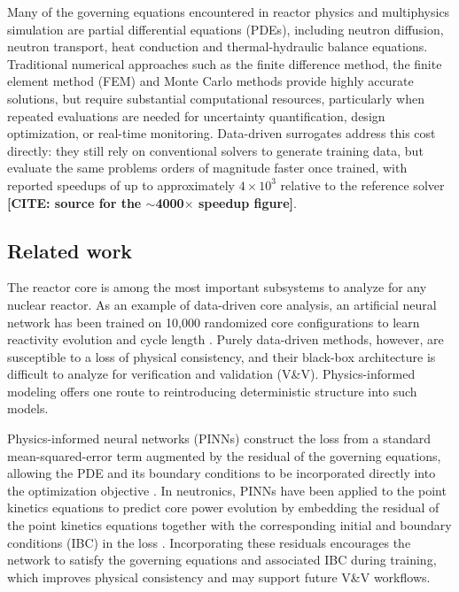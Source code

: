\documentclass[preprint,12pt]{elsarticle}
\newcommand{\todocite}[1]{\textbf{[CITE: #1]}}
\begin{document}
Many of the governing equations encountered in reactor physics and multiphysics
simulation are partial differential equations (PDEs), including neutron
diffusion, neutron transport, heat conduction and thermal-hydraulic balance
equations. Traditional numerical approaches such as the finite difference
method, the finite element method (FEM) and Monte Carlo methods provide highly
accurate solutions, but require substantial computational resources,
particularly when repeated evaluations are needed for uncertainty
quantification, design optimization, or real-time monitoring. Data-driven
surrogates address this cost directly: they still rely on conventional solvers
to generate training data, but evaluate the same problems orders of magnitude
faster once trained, with reported speedups of up to approximately
$4\times10^{3}$ relative to the reference solver
\todocite{source for the $\sim$4000$\times$ speedup figure}.

\subsection{Related work}
\label{sec:related}

The reactor core is among the most important subsystems to analyze for any
nuclear reactor. As an example of data-driven core analysis, an artificial
neural network has been trained on 10{,}000 randomized core configurations to
learn reactivity evolution and cycle length \citep{palmi2025}. Purely
data-driven methods, however, are susceptible to a loss of physical
consistency, and their black-box architecture is difficult to analyze for
verification and validation (V\&V). Physics-informed modeling offers one route
to reintroducing deterministic structure into such models.

Physics-informed neural networks (PINNs) construct the loss from a standard
mean-squared-error term augmented by the residual of the governing equations,
allowing the PDE and its boundary conditions to be incorporated directly into
the optimization objective \citep{raissi2019}. In neutronics, PINNs have
been applied to the point kinetics equations to predict core power evolution by
embedding the residual of the point kinetics equations together with the
corresponding initial and boundary conditions (IBC) in the loss
\citep{schiassi2022}. Incorporating these residuals encourages the network
to satisfy the governing equations and associated IBC during training, which
improves physical consistency and may support future V\&V workflows.
\end{document}
